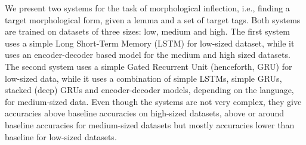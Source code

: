 We present two systems for the task of morphological inflection, i.e., finding a target morphological form, given a lemma and a set of target tags. Both systems are trained on datasets of three sizes: low, medium and high. The first system uses a simple Long Short-Term Memory (LSTM) for low-sized dataset, while it uses an encoder-decoder based model for the medium and high sized datasets. The second system uses a simple Gated Recurrent Unit (henceforth, GRU) for low-sized data, while it uses a combination of simple LSTMs, simple GRUs, stacked (deep) GRUs and encoder-decoder models, depending on the language, for medium-sized data. Even though the systems are not very complex, they give accuracies above baseline accuracies on high-sized datasets, above or around baseline accuracies for medium-sized datasets but mostly accuracies lower than baseline for low-sized datasets.

